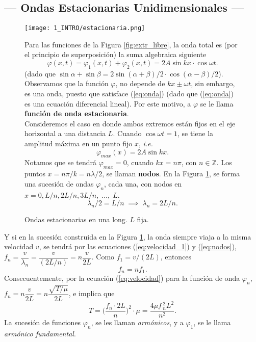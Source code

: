 \documentclass[10pt,a4paper]{article}
\begin{document}
\subsection{--- Ondas Estacionarias Unidimensionales ---} %
\label{sub:ondas_estacionarias}
\begin{figure}[ht]
\begin{minipage}{0.5\linewidth}
	\centering
	\texttt{[image: 1\_INTRO/estacionaria.png]}
	\caption{Ondas estacionarias en una long. \(L\) fija.}
	\label{fig:estacionaria}
\end{minipage}
\begin{minipage}{0.5\linewidth}
	Para las funciones de la Figura \ref{fig:extr_libre}, la onda total es (por el principio de superposición) la suma algebraica siguiente
	\[
		\varphi (x,t) = \varphi _1(x,t) + \varphi _2(x,t) = 2A \sin kx \cdot \cos \omega t.
	\]
	(dado que \(\sin \alpha + \sin \beta = 2 \sin (\alpha + \beta) /2 \cdot \cos (\alpha - \beta) /2\)).
	Observamos que la función \(\varphi\), no depende de \(kx \pm \omega t\), sin embargo, es una onda, puesto que satisface (\ref{eq:onda}) (dado que (\ref{eq:onda}) es una ecuación diferencial lineal).
	Por este motivo, a \(\varphi\) se le llama \textbf{función de onda estacionaria}. \\[2mm]
	Consideremos el caso en donde ambos extremos están fijos en el eje horizontal a una distancia \(L\).
	Cuando \(\cos \omega t = 1\), se tiene la amplitud máxima en un punto fijo \(x\), \textit{i.e.} \vspace{-2mm}
	\[
		\varphi _{max} (x) = 2A \sin kx.
	\]
	Notamos que se tendrá \(\varphi _{max} = 0\), cuando \(kx = n \pi\), con \(n \in \mathds{Z}\).
	Los puntos \(x = n \pi /k = n \lambda /2\), se llaman \textbf{nodos}.
	En la Figura \ref{fig:estacionaria}, se forma una sucesión de ondas \(\varphi _n\), cada una, con nodos en \(x =0, L/ n,2L/n,3L/n, \;\ldots,\; L\).
	\begin{equation}
		\lambda _n/2 = L/n \;\implies\; \lambda _n = 2L/n.
		\label{eq:nodos}
	\end{equation}
\end{minipage}
\end{figure}
\newpage
Y si en la sucesión construida en la Figura \ref{fig:estacionaria}, la onda siempre viaja a la misma velocidad \(v\), se tendrá por las ecuaciones (\ref{eq:velocidad_1}) y (\ref{eq:nodos}), \(f_n = \dfrac{v}{\lambda _n} = \dfrac{v}{(2L/n)} = n\dfrac{v}{2L}\).
Como \(f_1=v/(2L)\), entonces
\begin{equation}
	f_n = n f_1.
	\label{eq:frecuencia}
\end{equation}
Consecuentemente, por la ecuación (\ref{eq:velocidad}) para la función de onda \(\varphi _n\), \(f_n = n \dfrac{v}{2L} = n \dfrac{\sqrt{T/ \mu}}{2L}\), e implica que
\begin{equation}
	T = \bigg(\dfrac{f_n \cdot 2L}{n}\bigg) ^2 \cdot \mu = \dfrac{4 \mu f\,_n^2L^2}{n^2}.
	\label{eq:tension}
\end{equation}
La sucesión de funciones \(\varphi _n\), se les llaman \textit{armónicos}, y a \(\varphi _1\), se le llama \textit{armónico fundamental}.
\end{document}
